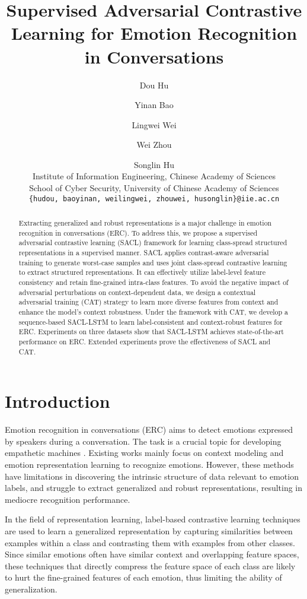 \documentclass[11pt]{article}
\title{Supervised Adversarial Contrastive Learning for Emotion Recognition \\ in Conversations}
\author{Dou Hu
        \and Yinan Bao
        \and Lingwei Wei
        \and Wei Zhou
        \and Songlin Hu
         \\
         Institute of Information Engineering, Chinese Academy of Sciences \\
         School of Cyber Security, University of Chinese Academy of Sciences  \\
        \texttt{\{hudou, baoyinan, weilingwei, zhouwei, husonglin\}@iie.ac.cn} \\
}
\begin{document}
\maketitle
\begingroup\def\thefootnote{*}\endgroup
\begin{abstract}
Extracting generalized and robust representations is a major challenge in emotion recognition in conversations (ERC). To address this, we propose a supervised adversarial contrastive learning (SACL) framework for learning class-spread structured representations in a supervised manner. SACL applies contrast-aware adversarial training to generate worst-case samples and uses joint class-spread contrastive learning to extract structured representations. It can effectively utilize label-level feature consistency and retain fine-grained intra-class features. To avoid the negative impact of adversarial perturbations on context-dependent data, we design a contextual adversarial training (CAT) strategy to learn more diverse features from context and enhance the model's context robustness. Under the framework with CAT, we develop a sequence-based SACL-LSTM to learn label-consistent and context-robust features for ERC. Experiments on three datasets show that SACL-LSTM achieves state-of-the-art performance on ERC. Extended experiments prove the effectiveness of SACL and CAT.
\end{abstract}

\section{Introduction}
Emotion recognition in conversations (ERC) aims to detect emotions expressed by speakers during a conversation. 
The task is a crucial topic for developing empathetic machines \cite{DBLP:journals/inffus/MaNXC20}.
Existing works mainly focus on context modeling \cite{DBLP:conf/aaai/MajumderPHMGC19,DBLP:conf/emnlp/GhosalMPCG19,DBLP:conf/acl/HuWH20} and emotion representation learning \cite{DBLP:conf/acl/ZhuP0ZH20,DBLP:conf/aaai/YangSMC22,DBLP:conf/aaai/LiYQ22} to recognize emotions.
However, these methods have limitations in discovering the intrinsic structure of data relevant to emotion labels, and struggle to extract generalized and robust representations, resulting in mediocre recognition performance.

In the field of representation learning, label-based contrastive learning \cite{khosla2020supervised,lopez2022supervised} techniques are used to learn a generalized representation by capturing similarities between examples within a class and contrasting them with examples from other classes.
Since similar emotions often have similar context and overlapping feature spaces, these techniques that directly compress the feature space of each class are likely to hurt the fine-grained features of each emotion, thus limiting the ability of generalization.
\end{document}
